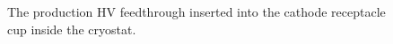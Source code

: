 \begin{figure}
\caption{The production HV feedthrough inserted into the cathode receptacle cup inside the cryostat.}
\label{fig:hv-FT-cryostat}
\end{figure}
